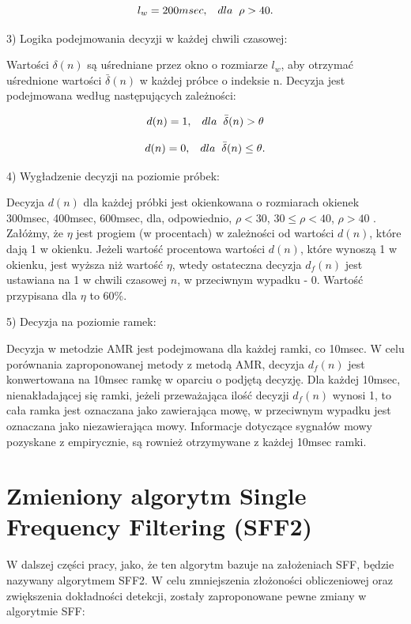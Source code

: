 \documentclass[eng,printmode]{mgr}
\begin{document}
  $$l_{w} = 200msec,\hspace{3mm}dla\hspace{2mm} \rho>40.$$\vspace{5mm}
  
  3) Logika podejmowania decyzji w każdej chwili czasowej:
  
  Wartości $\delta(n)$ są uśredniane przez okno o rozmiarze $l_{w}$, aby otrzymać uśrednione wartości $\bar{\delta}(n)$ w każdej próbce o indeksie n. Decyzja jest podejmowana według następujących zależności:
  
  $$d(n) = 1,\hspace{3mm}dla\hspace{2mm}\bar{\delta}(n)>\theta$$
  
  $$d(n) = 0,\hspace{3mm}dla\hspace{2mm}\bar{\delta}(n)\leq\theta.$$\vspace{5mm}
  
  4) Wygładzenie decyzji na poziomie próbek:
  
  Decyzja $d(n)$ dla każdej próbki jest okienkowana o rozmiarach okienek 300msec, 400msec, 600msec, dla, odpowiednio, $\rho<30$, $30\leq\rho<40$, $\rho>40$ . Załóżmy, że $\eta$ jest progiem (w procentach) w zależności od wartości $d(n)$, które dają 1 w okienku. Jeżeli wartość procentowa wartości $d(n)$, które wynoszą 1 w okienku, jest wyższa niż wartość $\eta$, wtedy ostateczna decyzja $d_f(n)$ jest ustawiana na 1 w chwili czasowej $n$, w przeciwnym wypadku - 0. Wartość przypisana dla $\eta$ to 60\%.\vspace{5mm}
  
  5) Decyzja na poziomie ramek:
  
  Decyzja w metodzie AMR jest podejmowana dla każdej ramki, co 10msec. W celu porównania zaproponowanej metody z metodą AMR, decyzja $d_{f}(n)$ jest konwertowana na 10msec ramkę w oparciu o podjętą decyzję. Dla każdej 10msec, nienakładającej się ramki, jeżeli przeważająca ilość decyzji $d_{f}(n)$ wynosi 1, to cała ramka jest oznaczana jako zawierająca mowę, w przeciwnym wypadku jest oznaczana jako niezawierająca mowy. Informacje dotyczące sygnałów mowy pozyskane z empirycznie, są rownież otrzymywane z każdej 10msec ramki.
  
  
 \newpage
 
\section{Zmieniony algorytm Single Frequency Filtering (SFF2)}
W dalszej części pracy, jako, że ten algorytm bazuje na założeniach SFF, będzie nazywany algorytmem SFF2.
W celu zmniejszenia złożoności obliczeniowej oraz zwiększenia dokładności detekcji, zostały zaproponowane pewne zmiany w algorytmie SFF:\vspace{5mm}
\end{document}

